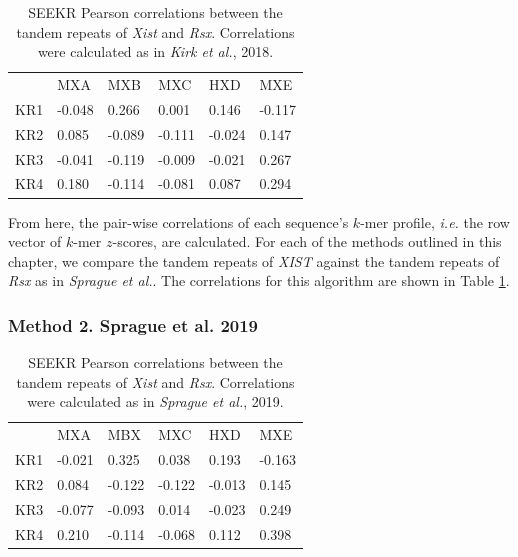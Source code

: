 \begin{table}[h]
\begin{center}
\begin{tabular}{llllll}
&MXA & MXB                   & MXC                  & HXD                   & MXE                                         \\
KR1 & -0.048 & 0.266   & 0.001 & 0.146    & -0.117 \\
KR2 & 0.085   & -0.089  & -0.111  & -0.024 & 0.147  \\
KR3 & -0.041 & -0.119   & -0.009 & -0.021 & 0.267   \\
KR4 & 0.180   & -0.114 & -0.081  & 0.087   & 0.294 
\end{tabular}
\caption{SEEKR Pearson correlations between the tandem repeats of \emph{Xist} and \emph{Rsx}. Correlations were calculated as in \emph{Kirk et al.}, 2018.}
\label{tbl:kmers1}

\end{center}
\end{table}

From here, the pair-wise correlations of each sequence's $k$-mer profile, \emph{i.e.} the row vector of $k$-mer $z$-scores, are calculated. For each of the methods outlined in this chapter, we compare the tandem repeats of \emph{XIST} against the tandem repeats of \emph{Rsx} as in \emph{Sprague et al.}. The correlations for this algorithm are shown in Table \ref{tbl:kmers1}.

\subsubsection{Method 2. Sprague et al. 2019}

\begin{table}[h]
\begin{center}
\begin{tabular}{llllll}
&MXA & MBX                  & MXC                  & HXD                  & MXE                                        \\
KR1 & -0.021 & 0.325   & 0.038 & 0.193   & -0.163 \\
KR2 & 0.084  & -0.122  & -0.122 & -0.013 & 0.145  \\
KR3 & -0.077   & -0.093 & 0.014 & -0.023 & 0.249   \\
KR4 & 0.210   & -0.114 & -0.068 & 0.112   & 0.398
\end{tabular}
\caption{SEEKR Pearson correlations between the tandem repeats of \emph{Xist} and \emph{Rsx}. Correlations were calculated as in \emph{Sprague et al.}, 2019.}
\label{tbl:kmers2}

\end{center}
\end{table}

